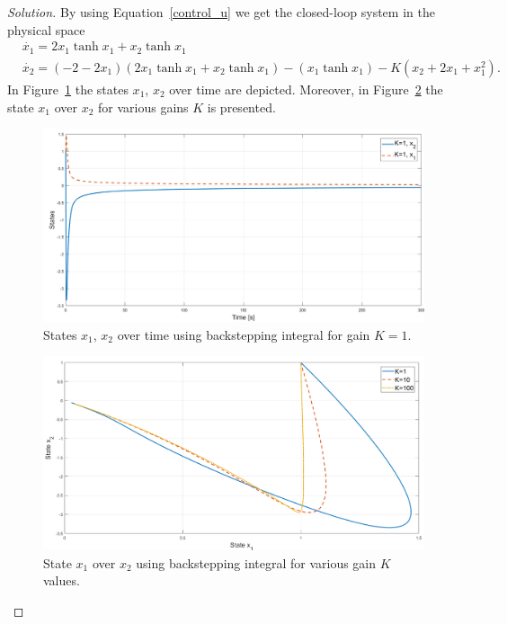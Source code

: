 \documentclass[12pt]{article}
\newenvironment{solution}{\begin{proof}[Solution]}{\end{proof}}
\begin{document}
\begin{solution}
By using Equation~\ref{control_u} we get the closed-loop system in the physical space
\begin{align}\label{eta_zeta}
&\dot{x_1}= 2x_1 \tanh x_1 +x_2 \tanh x_1 \\
&\dot{x_2}=(-2-2x_1)(2x_1 \tanh x_1+x_2 \tanh x_1)-(x_1 \tanh x_1)-K(x_2+2x_1+x_1^2).
\end{align}
In Figure~\ref{fig:x_1-t} the states $x_1$, $x_2$ over time are depicted. Moreover, in Figure~\ref{fig:x_1-x_2} the state $x_1$ over $x_2$ for various gains $K$ is presented.
\begin{figure}[!h]
	\includegraphics[scale=0.35]{figures/x1_t_p4a.png}
	\centering
	\caption{States $x_1$, $x_2$ over time using backstepping integral for gain $K=1$.}
	\label{fig:x_1-t}
\end{figure}
\begin{figure}[!h]
	\includegraphics[scale=0.35]{figures/x1_x2_p4a.png}
	\centering
	\caption{State $x_1$ over $x_2$ using backstepping integral for various gain $K$ values.}
	\label{fig:x_1-x_2}
\end{figure}
\end{solution}
\end{document}
